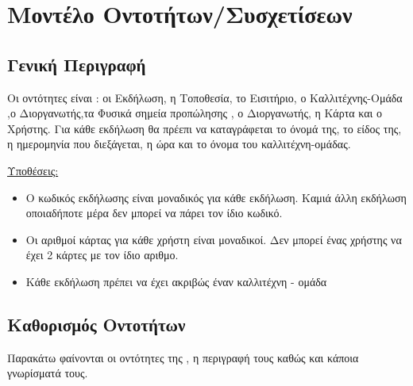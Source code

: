 ﻿\section{Μοντέλο Οντοτήτων/Συσχετίσεων}

\subsection{Γενική Περιγραφή}

Οι οντότητες είναι : οι Εκδήλωση, η Τοποθεσία, το Εισιτήριο, ο Καλλιτέχνης-Ομάδα ,ο
Διοργανωτής,τα Φυσικά σημεία προπώλησης , ο Διοργανωτής, η Κάρτα και ο
Χρήστης. Για κάθε εκδήλωση θα πρέεπι να καταγράφεται το όνομά της, το
είδος της, η ημερομηνία που διεξάγεται, η ώρα και το όνομα του
καλλιτέχνη-ομάδας.

\underline{Υποθέσεις:}
\begin{itemize}[noitemsep]
\item Ο κωδικός εκδήλωσης είναι μοναδικός για κάθε εκδήλωση. Καμιά άλλη εκδήλωση
οποιαδήποτε μέρα δεν μπορεί να πάρει τον ίδιο κωδικό.
\item Οι αριθμοί κάρτας για κάθε χρήστη είναι μοναδικοί. Δεν μπορεί
  ένας χρήστης να έχει 2 κάρτες με τον ίδιο αριθμο.
\item Κάθε εκδήλωση πρέπει να έχει ακριβώς έναν καλλιτέχνη - ομάδα 
  \end{itemize}

\subsection{Καθορισμός Οντοτήτων}

Παρακάτω φαίνονται οι οντότητες της \titlos, η περιγραφή τους καθώς
και κάποια γνωρίσματά τους.

